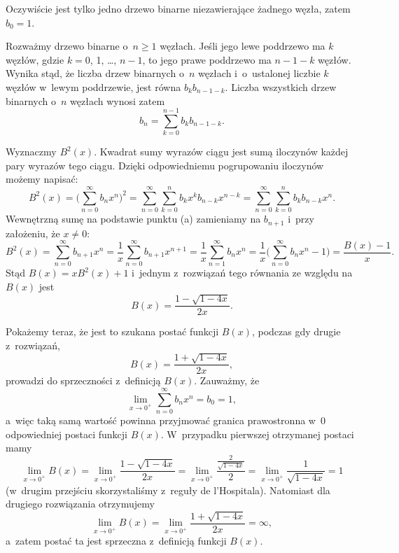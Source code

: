 
\subproblem %
Oczywiście jest tylko jedno drzewo binarne niezawierające żadnego węzła, zatem $b_0=1$.

Rozważmy drzewo binarne o~$n\ge1$ węzłach.
Jeśli jego lewe poddrzewo ma $k$ węzłów, gdzie $k=0$, 1, \dots, $n-1$, to jego prawe poddrzewo ma $n-1-k$ węzłów.
Wynika stąd, że liczba drzew binarnych o~$n$ węzłach i~o~ustalonej liczbie $k$ węzłów w~lewym poddrzewie, jest równa $b_kb_{n-1-k}$.
Liczba wszystkich drzew binarnych o~$n$ węzłach wynosi zatem
\[
	b_n = \sum_{k=0}^{n-1}b_kb_{n-1-k}.
\]

\subproblem %
Wyznaczmy $B^2(x)$.
Kwadrat sumy wyrazów ciągu jest sumą iloczynów każdej pary wyrazów tego ciągu.
Dzięki odpowiedniemu pogrupowaniu iloczynów możemy napisać:
\[
	B^2(x) = \biggl(\sum_{n=0}^\infty b_nx^n\biggr)^2 = \sum_{n=0}^\infty\sum_{k=0}^nb_kx^kb_{n-k}x^{n-k} = \sum_{n=0}^\infty\sum_{k=0}^nb_kb_{n-k}x^n.
\]
Wewnętrzną sumę na podstawie punktu (a) zamieniamy na $b_{n+1}$ i~przy założeniu, że $x\ne0$:
\[
	B^2(x) = \sum_{n=0}^\infty b_{n+1}x^n = \frac{1}{x}\sum_{n=0}^\infty b_{n+1}x^{n+1} = \frac{1}{x}\sum_{n=1}^\infty b_nx^n = \frac{1}{x}\biggl(\sum_{n=0}^\infty b_nx^n-1\biggr) = \frac{B(x)-1}{x}.
\]
Stąd $B(x)=xB^2(x)+1$ i~jednym z~rozwiązań tego równania ze względu na $B(x)$ jest
\[
	B(x) = \frac{1-\sqrt{1-4x}}{2x}.
\]

Pokażemy teraz, że jest to szukana postać funkcji $B(x)$, podczas gdy drugie z~rozwiązań,
\[
	B(x) = \frac{1+\sqrt{1-4x}}{2x},
\]
prowadzi do sprzeczności z~definicją $B(x)$.
Zauważmy, że
\[
	\lim_{x\to0^+}\sum_{n=0}^\infty b_nx^n = b_0 = 1,
\]
a~więc taką samą wartość powinna przyjmować granica prawostronna w~0 odpowiedniej postaci funkcji $B(x)$.
W~przypadku pierwszej otrzymanej postaci mamy
\[
	\lim_{x\to0^+}B(x) = \lim_{x\to0^+}\frac{1-\sqrt{1-4x}}{2x} = \lim_{x\to0^+}\frac{\frac{2}{\sqrt{1-4x}}}{2} = \lim_{x\to0^+}\frac{1}{\sqrt{1-4x}} = 1
\]
(w~drugim przejściu skorzystaliśmy z~reguły de l'Hospitala).
Natomiast dla drugiego rozwiązania otrzymujemy
\[
	\lim_{x\to0^+}B(x) = \lim_{x\to0^+}\frac{1+\sqrt{1-4x}}{2x} = \infty,
\]
a~zatem postać ta jest sprzeczna z~definicją funkcji $B(x)$.

\subproblem %


